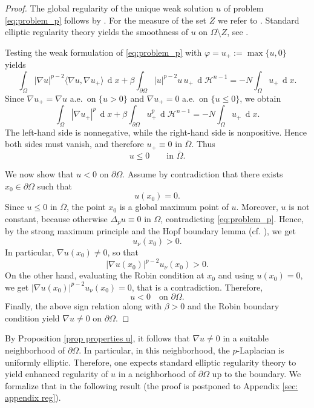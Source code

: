 \documentclass[10pt,a4paper, reqno]{amsart}
\numberwithin{equation}{section}
\renewcommand{\d}[1]{\ensuremath{\operatorname{d}\!{#1}}}
\begin{document}
\begin{proof}
The global regularity of the unique weak solution $u$ of problem \eqref{eq:problem_p} follows by \cite[Theorem 2]{Lieberman88}. For the measure of the set $Z$ we refer to \cite[Corollary 1.1]{Lou2008}. Standard elliptic regularity theory yields the smoothness of $u$ on $\Omega \setminus Z$, see \cite[Lemma 3.1]{fgk}.

Testing the weak formulation of \eqref{eq:problem_p} with $\varphi= u_+ := \max\{u,0\}$ yields
\[
\int_\Omega |\nabla u|^{p-2} \langle\nabla u,  \nabla u_+ \rangle\,\d{x}
+\beta\int_{\partial\Omega}|u|^{p-2}u\,u_+\,\d{\mathcal H^{n-1}}
=-N\int_\Omega u_+\,\d{x}.
\]
Since $\nabla u_+=\nabla u$ a.e.\ on $\{u>0\}$ and $\nabla u_+=0$ a.e.\ on $\{u\le 0\}$, we obtain
\[
\int_\Omega |\nabla u_+|^p\,\d{x}
+\beta\int_{\partial\Omega}u_+^p\,\d{\mathcal H^{n-1}}
=-N\int_\Omega u_+\,\d{x}.
\]
The left-hand side is nonnegative, while the right-hand side is nonpositive. Hence both sides must vanish, and therefore $u_+\equiv 0$ in $\overline{\Omega}$.
Thus
\[
u\le 0 \qquad \text{in }\overline{\Omega}.
\]

We now show that $u<0$ on $\partial\Omega$. Assume by contradiction that there exists $x_0\in\partial\Omega$ such that
\[
u(x_0)=0.
\]
Since $u\le 0$ in $\overline{\Omega}$, the point $x_0$ is a global maximum point of $u$. Moreover, $u$ is not constant, because otherwise $\Delta_p u\equiv 0$ in $\Omega$, 
contradicting \eqref{eq:problem_p}. Hence, by the strong maximum principle and the Hopf boundary lemma (cf. \cite[Chapter 5]{PucciSerrin07}), we get
\[
u_\nu(x_0) > 0.
\]
In particular, $\nabla u(x_0)\neq 0$, so that
\[
|\nabla u(x_0)|^{p-2} u_\nu(x_0)>0.
\]
On the other hand, evaluating the Robin condition at $x_0$ and using $u(x_0)=0$, we get $|\nabla u(x_0)|^{p-2} u_\nu(x_0)=0$, that is a contradiction. Therefore,
\[
u<0 \quad \text{on }\partial\Omega.
\]
Finally, the above sign relation along with $\beta >0$ and the Robin boundary condition yield $\nabla u \neq 0$ on $\partial\Omega$.
\end{proof}

By Proposition \ref{prop properties u}, it follows that $\nabla u \neq 0$ in a suitable neighborhood of $\partial\Omega$. In particular, in this neighborhood, the $p$-Laplacian is uniformly elliptic. Therefore, one expects standard elliptic regularity theory to yield enhanced regularity of $u$ in a neighborhood of $\partial\Omega$ up to the boundary. We formalize that in the following result (the proof is postponed to Appendix \ref{sec: appendix reg}). 
\end{document}
